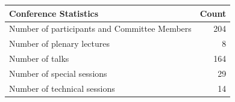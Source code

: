 \begin{table}[h]
\centering
\begin{tabular}{|l|r|}
\hline
\textbf{Conference Statistics} & \textbf{Count} \\
\hline
Number of participants and Committee Members & 204 \\
\hline
Number of plenary lectures & 8 \\
\hline
Number of talks & 164 \\
\hline
Number of special sessions & 29 \\
\hline
Number of technical sessions & 14 \\
\hline
\end{tabular}
\end{table}
